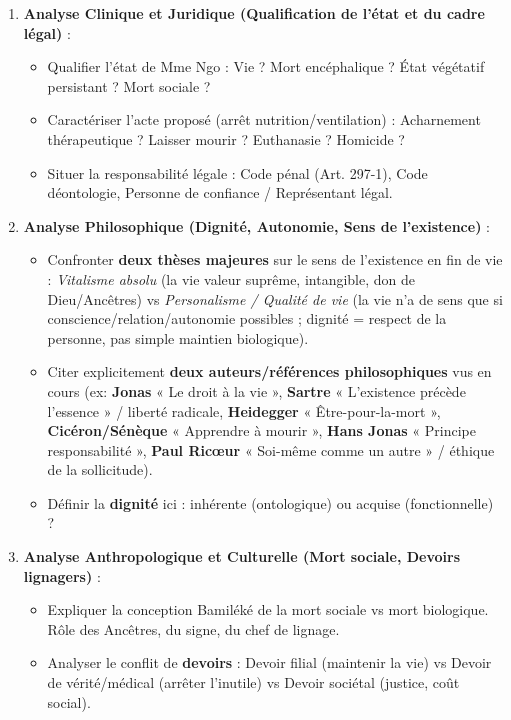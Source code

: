 \documentclass[11pt]{article}
\newcommand{\cle}[1]{{\popxbold\color{popdark}#1}}
\begin{document}
\begin{enumerate}
    \item \textbf{Analyse Clinique et Juridique (Qualification de l'état et du cadre légal)} : 
    \begin{itemize}
        \item Qualifier l'état de Mme Ngo : Vie ? Mort encéphalique ? État végétatif persistant ? Mort sociale ?
        \item Caractériser l'acte proposé (arrêt nutrition/ventilation) : Acharnement thérapeutique ? Laisser mourir ? Euthanasie ? Homicide ?
        \item Situer la responsabilité légale : Code pénal (Art. 297-1), Code déontologie, Personne de confiance / Représentant légal.
    \end{itemize}
    \item \textbf{Analyse Philosophique (Dignité, Autonomie, Sens de l'existence)} : 
    \begin{itemize}
        \item Confronter \textbf{deux thèses majeures} sur le sens de l'existence en fin de vie : \emph{Vitalisme absolu} (la vie valeur suprême, intangible, don de Dieu/Ancêtres) vs \emph{Personalisme / Qualité de vie} (la vie n'a de sens que si conscience/relation/autonomie possibles ; dignité = respect de la personne, pas simple maintien biologique).
        \item Citer explicitement \textbf{deux auteurs/références philosophiques} vus en cours (ex: \textbf{Jonas} « Le droit à la vie », \textbf{Sartre} « L'existence précède l'essence » / liberté radicale, \textbf{Heidegger} « Être-pour-la-mort », \textbf{Cicéron/Sénèque} « Apprendre à mourir », \textbf{Hans Jonas} « Principe responsabilité », \textbf{Paul Ricœur} « Soi-même comme un autre » / éthique de la sollicitude).
        \item Définir la \textbf{dignité} ici : inhérente (ontologique) ou acquise (fonctionnelle) ?
    \end{itemize}
    \item \textbf{Analyse Anthropologique et Culturelle (Mort sociale, Devoirs lignagers)} : 
    \begin{itemize}
        \item Expliquer la conception Bamiléké de la \cle{mort sociale} vs \cle{mort biologique}. Rôle des \cle{Ancêtres}, du \cle{signe}, du \cle{chef de lignage}.
        \item Analyser le conflit de \textbf{devoirs} : Devoir filial (maintenir la vie) vs Devoir de vérité/médical (arrêter l'inutile) vs Devoir sociétal (justice, coût social).

\end{itemize}
\end{enumerate}
\end{document}
